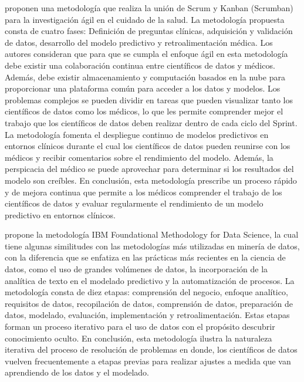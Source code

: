 \cite{Lei2020} proponen una metodología que realiza la unión de Scrum y Kanban (Scrumban) para la investigación ágil en el cuidado de la salud. La metodología propuesta consta de cuatro fases: Definición de preguntas clínicas, adquisición y validación de datos, desarrollo del modelo predictivo y retroalimentación médica. Los autores consideran que para que se cumpla el enfoque ágil en esta metodología debe existir una colaboración continua entre científicos de datos y médicos. Además, debe existir almacenamiento y computación basados en la nube para proporcionar una plataforma común para acceder a los datos y modelos. Los problemas complejos se pueden dividir en tareas que pueden visualizar tanto los científicos de datos como los médicos, lo que les permite comprender mejor el trabajo que los científicos de datos deben realizar dentro de cada ciclo del Sprint. La metodología fomenta el despliegue continuo de modelos predictivos en entornos clínicos durante el cual los científicos de datos pueden reunirse con los médicos y recibir comentarios sobre el rendimiento del modelo. Además, la perspicacia del médico se puede aprovechar para determinar si los resultados del modelo son creíbles. En conclusión, esta metodología prescribe un proceso rápido y de mejora continua que permite a los médicos comprender el trabajo de los científicos de datos y evaluar regularmente el rendimiento de un modelo predictivo en entornos clínicos.

\cite{Rollins2015} propone la metodología IBM Foundational Methodology for Data Science, la cual tiene algunas similitudes con las metodologías más utilizadas en minería de datos, con la diferencia que se enfatiza en las prácticas más recientes en la ciencia de datos, como el uso de grandes volúmenes de datos, la incorporación de la analítica de texto en el modelado predictivo y la automatización de procesos. La metodología consta de diez etapas: comprensión del negocio, enfoque analítico, requisitos de datos, recopilación de datos, comprensión de datos, preparación de datos, modelado, evaluación, implementación y retroalimentación. Estas etapas forman un proceso iterativo para el uso de datos con el propósito descubrir conocimiento oculto. En conclusión, esta metodología ilustra la naturaleza iterativa del proceso de resolución de problemas en donde, los científicos de datos vuelven frecuentemente a etapas previas para realizar ajustes a medida que van aprendiendo de los datos y el modelado.  

